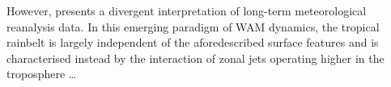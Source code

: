\documentclass[a4paper]{article}
\begin{document}
However, \citeauthor{nicholson2009revised} \parencite{nicholson2009revised} presents a divergent interpretation of long-term meteorological reanalysis data.
In this emerging paradigm of WAM dynamics, the tropical rainbelt is largely independent of the aforedescribed surface features \parencite{grist2001study} and is characterised instead by the interaction of zonal jets operating higher in the troposphere \ldots
\end{document}
